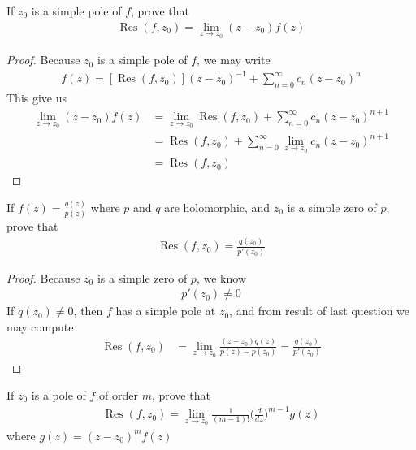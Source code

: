\documentclass{report}
\begin{document}
\begin{question}{}{}
If $z_0$ is a simple pole of  $f$, prove that 
\begin{align*}
\operatorname{Res}(f,z_0)= \lim_{z\to z_0} (z-z_0)f(z)
\end{align*}
\end{question}
\begin{proof}
Because $z_0$ is a simple pole of  $f$, we may write 
 \begin{align*}
   f(z)= [\operatorname{Res}(f,z_0)](z-z_0)^{-1}+ \sum_{n=0}^{\infty} c_n(z-z_0)^n
\end{align*}
This give us 
\begin{align*}
\lim_{z\to z_0}(z-z_0)f(z)&= \lim_{z\to z_0}\operatorname{Res}(f,z_0)+ \sum_{n=0}^{\infty}c_n(z-z_0)^{n+1} \\
&=\operatorname{Res}(f,z_0)+ \sum_{n=0}^{\infty} \lim_{z\to z_0}c_n (z-z_0)^{n+1} \\
&=\operatorname{Res}(f,z_0)
\end{align*}
\end{proof}
\begin{question}{}{}
If  $f(z)=\frac{q(z)}{p(z)}$ where $p$ and $q$ are holomorphic, and  $z_0$ is a simple zero of  $p$, prove that 
\begin{align*}
\operatorname{Res}(f,z_0)= \frac{q(z_0)}{p'(z_0)}
\end{align*}
\end{question}
\begin{proof}
Because $z_0$ is a simple zero of $p$, we know 
\begin{align*}
p'(z_0)\neq 0
\end{align*}
If $q(z_0)\neq 0$, then $f$ has a simple pole at $z_0$, and from result of last question we may compute 
 \begin{align*}
\operatorname{Res}(f,z_0)&= \lim_{z\to z_0} \frac{(z-z_0)q(z)}{p(z)-p(z_0)}= \frac{q(z_0)}{p'(z_0)} 
\end{align*}
\end{proof}
\begin{question}{}{}
If $z_0$ is a pole of  $f$ of order $m$, prove that 
 \begin{align*}
\operatorname{Res}(f,z_0)=\lim_{z\to z_0} \frac{1}{(m-1)!}\Big(\frac{d}{dz}\Big)^{m-1} g(z)
\end{align*}
where $g(z)=(z-z_0)^m f(z)$
\end{question}
\end{document}
